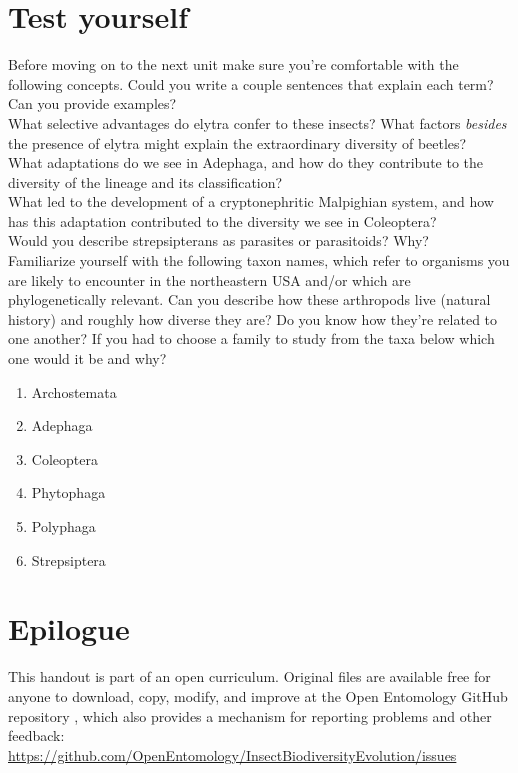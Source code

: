 \documentclass[letterpaper, 11pt]{article}
\begin{document}
\FloatBarrier
\section*{Test yourself}
Before moving on to the next unit make sure you're comfortable with the following concepts. Could you write a couple sentences that explain each term? Can you provide examples?\\

\noindent{}What selective advantages do elytra confer to these insects? What factors \textit{besides} the presence of elytra might explain the extraordinary diversity of beetles?\\

\noindent{}What adaptations do we see in Adephaga, and how do they contribute to the diversity of the lineage and its classification?\\

\noindent{}What led to the development of a cryptonephritic Malpighian system, and how has this adaptation contributed to the diversity we see in Coleoptera?\\

\noindent{}Would you describe strepsipterans as parasites or parasitoids? Why?\\

\noindent{}Familiarize yourself with the following taxon names, which refer to organisms you are likely to encounter in the northeastern USA and/or which are phylogenetically relevant. Can you describe how these arthropods live (natural history) and roughly how diverse they are? Do you know how they're related to one another? If you had to choose a family to study from the taxa below which one would it be and why?
\begin{enumerate} 
\item Archostemata
\item Adephaga
\item Coleoptera  
\item Phytophaga
\item Polyphaga
\item Strepsiptera
\end{enumerate}

\FloatBarrier
\section*{Epilogue}
This handout is part of an open curriculum. Original files are available free for anyone to download, copy, modify, and improve at the Open Entomology GitHub repository \citep{ENT432}, which also provides a mechanism for reporting problems and other feedback:\\
\url{https://github.com/OpenEntomology/InsectBiodiversityEvolution/issues}
\end{document}
